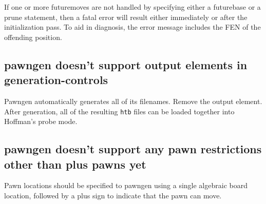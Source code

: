\documentclass[11pt]{article}
\begin{document}
If one or more futuremoves are not handled by specifying either a
futurebase or a prune statement, then a fatal error will result either
immediately or after the initialization pass.  To aid in diagnosis,
the error message includes the FEN of the offending position.

\subsection{pawngen doesn't support output elements in generation-controls}

Pawngen automatically generates all of its filenames.  Remove the
output element.  After generation, all of the resulting {\tt htb}
files can be loaded together into Hoffman's probe mode.

\subsection{pawngen doesn't support any pawn restrictions other than plus pawns yet}

Pawn locations should be specified to pawngen using a single algebraic
board location, followed by a plus sign to indicate that the pawn can
move.
\end{document}
